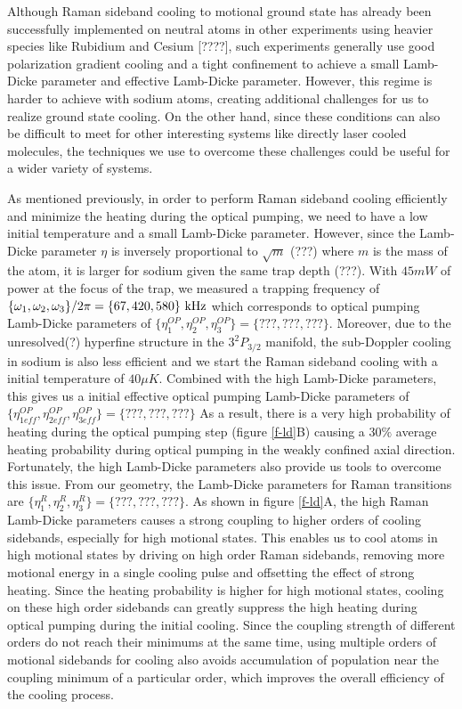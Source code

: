 \documentclass[aps,prl,twocolumn,groupedaddress]{revtex4-1}
\begin{document}
Although Raman sideband cooling to motional ground state has already been successfully
implemented on neutral atoms in other experiments using heavier species like Rubidium
\cite{Thompson2013,Kaufman2012}
and Cesium [????], such experiments generally use good polarization gradient cooling
and a tight confinement to achieve a small Lamb-Dicke parameter and effective Lamb-Dicke parameter.
However, this regime is harder to achieve with sodium atoms, creating additional challenges for
us to realize ground state cooling. On the other hand, since these conditions can also be difficult
to meet for other interesting systems like directly laser cooled molecules, the techniques we
use to overcome these challenges could be useful for a wider variety of systems.

As mentioned previously, in order to perform Raman sideband cooling efficiently and
minimize the heating during the optical pumping, we need to have a low initial temperature and
a small Lamb-Dicke parameter. However, since the Lamb-Dicke parameter $\eta$ is inversely
proportional to $\sqrt{m}$ (???) where $m$ is the mass of the atom, it is larger for sodium
given the same trap depth (???).
With $45mW$ of power at the focus of the trap, we measured a trapping frequency of
$\{\omega_1,\omega_2,\omega_3\}/2\pi = \{67, 420, 580\}\ \text{\text{kHz}}$
which corresponds to optical pumping Lamb-Dicke parameters of
$\{\eta^{OP}_1,\eta^{OP}_2,\eta^{OP}_3\} = \{???, ???, ???\}$.
Moreover, due to the unresolved(?) hyperfine structure in the $3^2P_{3/2}$ manifold,
the sub-Doppler cooling in sodium is also less efficient and we start the
Raman sideband cooling with a initial temperature of $40\mu K$. Combined with the high Lamb-Dicke
parameters, this gives us a initial effective optical pumping Lamb-Dicke parameters of
$\{\eta^{OP}_{1eff},\eta^{OP}_{2eff},\eta^{OP}_{3eff}\} = \{???, ???, ???\}$
As a result, there is a very high probability of heating during the optical pumping step
(figure \ref{f-ld}B) causing a $30\%$ average heating probability during optical pumping
in the weakly confined axial direction. Fortunately, the high Lamb-Dicke parameters also
provide us tools to overcome this issue. From our geometry, the Lamb-Dicke parameters for
Raman transitions are $\{\eta^R_{1},\eta^R_{2},\eta^R_{3}\} = \{???, ???, ???\}$. As shown in
figure \ref{f-ld}A, the high Raman Lamb-Dicke parameters causes a strong coupling to higher orders
of cooling sidebands, especially for high motional states.
This enables us to cool atoms in high motional states by driving on high order Raman sidebands,
removing more motional energy in a single cooling pulse and offsetting the effect of
strong heating. Since the heating probability is higher for high motional states,
cooling on these high order sidebands can greatly suppress the high heating during
optical pumping during the initial cooling. Since the coupling strength of different orders
do not reach their minimums at the same time, using multiple orders of motional sidebands
for cooling also avoids accumulation of population near the coupling minimum of a particular
order, which improves the overall efficiency of the cooling process.
\end{document}
